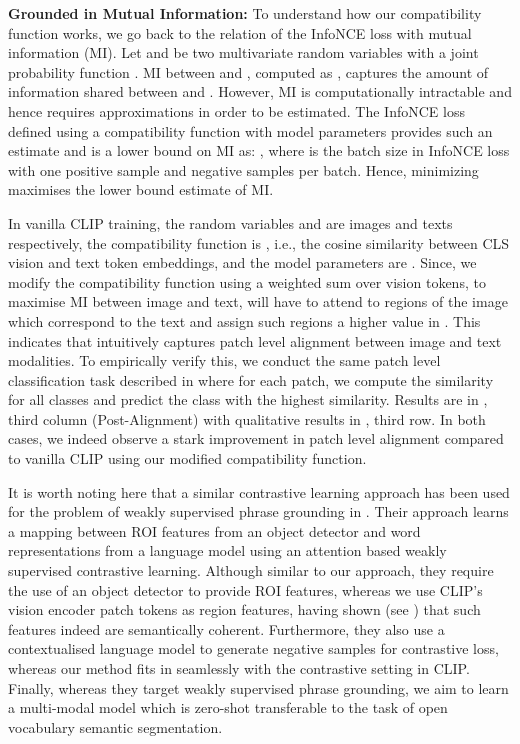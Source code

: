 \documentclass[10pt,twocolumn,letterpaper]{article}
\begin{document}
\textbf{Grounded in Mutual Information: } To understand how our compatibility function  works, we go back to the relation of the InfoNCE \cite{oord2018representation} loss with mutual information (MI). Let  and  be two multivariate random variables with a joint probability function . MI between  and , computed as , captures the amount of information shared between  and . However, MI is computationally intractable and hence requires approximations in order to be estimated. The InfoNCE loss  defined using a compatibility function  with model parameters  provides such an estimate and is a lower bound on MI as: , where  is the batch size in InfoNCE loss with one positive sample and  negative samples per batch. Hence, minimizing  maximises the lower bound estimate of MI.

In vanilla CLIP training, the random variables  and  are images  and texts  respectively, the compatibility function  is , i.e., the cosine similarity between CLS vision and text token embeddings, and the model parameters are .
Since, we modify the compatibility function  using a weighted sum over vision tokens, to maximise MI  between image and text,  will have to attend to regions of the image which correspond to the text and assign such regions a higher value in . This indicates that  intuitively captures patch level alignment between image and text modalities. To empirically verify this, we conduct the same patch level classification task described in  where for each patch, we compute the similarity  for all classes and predict the class with the highest similarity. Results are in , third column (Post-Alignment) with qualitative results in , third row. In both cases, we indeed observe a stark improvement in patch level alignment compared to vanilla CLIP using our modified compatibility function.

It is worth noting here that a similar contrastive learning approach has been used for the problem of weakly supervised phrase grounding in \cite{gupta2020contrastive}. Their approach learns a mapping between ROI features from an object detector and word representations from a language model using an attention based weakly supervised contrastive learning. Although similar to our approach, they require the use of an object detector to provide ROI features, whereas we use CLIP's vision encoder patch tokens as region features, having shown (see ) that such features indeed are semantically coherent. Furthermore, they also use a contextualised language model to generate negative samples for contrastive loss, whereas our method fits in seamlessly with the contrastive setting in CLIP. Finally, whereas they target weakly supervised phrase grounding, we aim to learn a multi-modal model which is zero-shot transferable to the task of open vocabulary semantic segmentation.
\end{document}
